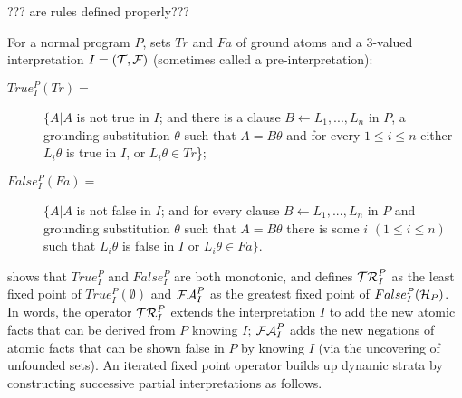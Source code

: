 ??? are rules defined properly???

\begin{definition} \label{def:dyn-ops}
For a normal program $P$, sets $Tr$ and $Fa$ of ground atoms and a
3-valued interpretation $I = (\cT,\cF)$ (sometimes called a pre-interpretation):
\begin{description} \item[$True^P_I(Tr) =$]
    $\{A|A$ is not true in $I$;  and 
                        there is a clause
                        $B \leftarrow L_1,...,L_n$
                in $P$, a grounding substitution $\theta$ such that
                $A = B\theta$ and for every $1 \leq i \leq n$ either
                $L_i\theta$ is true in $I$, or $L_i\theta \in Tr$\};
  \item[$False^P_I(Fa) =$] 
$\{A|A$ is not false in $I$; and for every
    clause $B \leftarrow L_1,...,L_n$ in $P$ and grounding substitution
    $\theta$ such that $A = B\theta$ there is some $i$ $(1 \leq i \leq
    n)$ such that $L_i\theta$ is false in $I$ or $L_i\theta \in Fa\}$.
\end{description}
\end{definition}
%
\cite{Przy89d} shows that $True^P_I$ and $False^P_I$ are both
monotonic, and defines $\mathcal{TR}^P_I$ as the least fixed point of $True^P_I(\emptyset)$
and $\calfalse^P_I$ as the greatest fixed point of
$False^P_I(\cH_P)$.
%
In words, the operator $\mathcal{TR}^P_I$ extends the interpretation $I$ to add
the new atomic facts that can be derived from $P$ knowing $I$; $\calfalse^P_I$
adds the new negations of atomic facts that can be shown false in $P$
by knowing $I$ (via the uncovering of unfounded sets).  An iterated
fixed point operator builds up dynamic strata by constructing
successive partial interpretations as follows.
